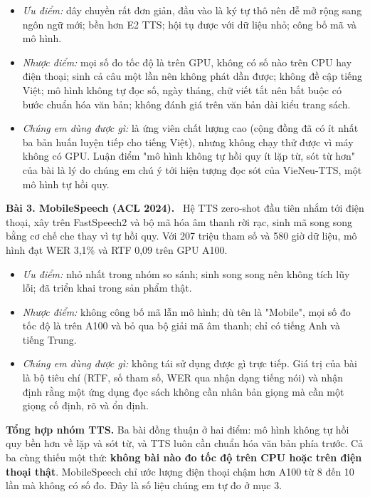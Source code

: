 \documentclass[12pt,a4paper]{article}
\providecommand{\tightlist}{\setlength{\itemsep}{2pt}\setlength{\parskip}{0pt}}
\begin{document}
\begin{itemize}
\tightlist
\item
  \emph{Ưu điểm:} dây chuyền rất đơn giản, đầu vào là ký tự thô nên dễ mở rộng sang ngôn ngữ mới; bền hơn E2 TTS; hội tụ được với dữ liệu nhỏ; công bố mã và mô hình.
\item
  \emph{Nhược điểm:} mọi số đo tốc độ là trên GPU, không có số nào trên CPU hay điện thoại; sinh cả câu một lần nên không phát dần được; không đề cập tiếng Việt; mô hình không tự đọc số, ngày tháng, chữ viết tắt nên bắt buộc có bước chuẩn hóa văn bản; không đánh giá trên văn bản dài kiểu trang sách.
\item
  \emph{Chúng em dùng được gì:} là ứng viên chất lượng cao (cộng đồng đã có ít nhất ba bản huấn luyện tiếp cho tiếng Việt), nhưng không chạy thử được vì máy không có GPU. Luận điểm "mô hình không tự hồi quy ít lặp từ, sót từ hơn" của bài là lý do chúng em chú ý tới hiện tượng đọc sót của VieNeu-TTS, một mô hình tự hồi quy.
\end{itemize}

\textbf{Bài 3. MobileSpeech (ACL 2024).}~\cite{b3} Hệ TTS zero-shot đầu tiên nhắm tới điện thoại, xây trên FastSpeech2 và bộ mã hóa âm thanh rời rạc, sinh mã song song bằng cơ chế che thay vì tự hồi quy. Với 207 triệu tham số và 580 giờ dữ liệu, mô hình đạt WER 3,1\% và RTF 0,09 trên GPU A100.

\begin{itemize}
\tightlist
\item
  \emph{Ưu điểm:} nhỏ nhất trong nhóm so sánh; sinh song song nên không tích lũy lỗi; đã triển khai trong sản phẩm thật.
\item
  \emph{Nhược điểm:} không công bố mã lẫn mô hình; dù tên là "Mobile", mọi số đo tốc độ là trên A100 và bỏ qua bộ giải mã âm thanh; chỉ có tiếng Anh và tiếng Trung.
\item
  \emph{Chúng em dùng được gì:} không tái sử dụng được gì trực tiếp. Giá trị của bài là bộ tiêu chí (RTF, số tham số, WER qua nhận dạng tiếng nói) và nhận định rằng một ứng dụng đọc sách không cần nhân bản giọng mà cần một giọng cố định, rõ và ổn định.
\end{itemize}

\textbf{Tổng hợp nhóm TTS.} Ba bài đồng thuận ở hai điểm: mô hình không tự hồi quy bền hơn về lặp và sót từ, và TTS luôn cần chuẩn hóa văn bản phía trước. Cả ba cùng thiếu một thứ: \textbf{không bài nào đo tốc độ trên CPU hoặc trên điện thoại thật}. MobileSpeech chỉ ước lượng điện thoại chậm hơn A100 từ 8 đến 10 lần mà không có số đo. Đây là số liệu chúng em tự đo ở mục 3.
\end{document}
